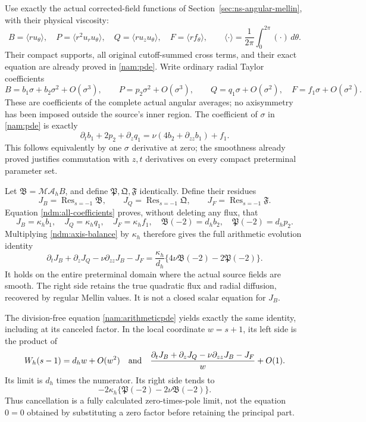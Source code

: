 Use exactly the actual corrected-field functions of
Section~\ref{sec:ns-angular-mellin}, with their physical viscosity:
\[
 B=\langle r u_\theta\rangle,\quad
 P=\langle r^2u_ru_\theta\rangle,\quad
 Q=\langle r u_z u_\theta\rangle,\quad
 F=\langle r f_\theta\rangle,\qquad
 \langle\cdot\rangle=\frac1{2\pi}\int_0^{2\pi}(\cdot)\,d\theta .
\]
Their compact supports, all original cutoff-summed cross terms,
and their exact equation are already proved in \eqref{nam:pde}.
Write ordinary radial Taylor coefficients
\[
 B=b_1\sigma+b_2\sigma^2+O(\sigma^3),\qquad
 P=p_2\sigma^2+O(\sigma^3),\qquad
 Q=q_1\sigma+O(\sigma^2),\quad F=f_1\sigma+O(\sigma^2).
\]
These are coefficients of the complete actual angular averages;
no axisymmetry has been imposed outside the source's inner region.
The coefficient of \(\sigma\) in \eqref{nam:pde} is exactly
\begin{equation}\label{ndm:axis-balance}
 \partial_tb_1+2p_2+\partial_zq_1
       =\nu(4b_2+\partial_{zz}b_1)+f_1 .
\end{equation}
This follows equivalently by one \(\sigma\) derivative at zero;
the smoothness already proved justifies commutation with \(z,t\)
derivatives on every compact preterminal parameter set.

Let \(\mathfrak B=\mathcal M\mathcal A_hB\), and define
\(\mathfrak P,\mathfrak Q,\mathfrak F\) identically.
Define their residues
\[
 J_B=\operatorname{Res}_{s=-1}\mathfrak B,\qquad
 J_Q=\operatorname{Res}_{s=-1}\mathfrak Q,\qquad
 J_F=\operatorname{Res}_{s=-1}\mathfrak F .
\]
Equation \eqref{ndm:all-coefficients} proves, without deleting any
flux, that
\[
 J_B=\kappa_hb_1,\quad J_Q=\kappa_hq_1,\quad
 J_F=\kappa_hf_1,\quad
 \mathfrak B(-2)=d_hb_2,\quad
 \mathfrak P(-2)=d_hp_2.
\]
Multiplying \eqref{ndm:axis-balance} by \(\kappa_h\) therefore gives
the full arithmetic evolution identity
\begin{equation}\label{ndm:arithmetic-balance}
 \boxed{\quad
 \partial_tJ_B+\partial_zJ_Q-\nu\partial_{zz}J_B-J_F
 =\frac{\kappa_h}{d_h}
      \{4\nu\mathfrak B(-2)-2\mathfrak P(-2)\}.\quad}
\end{equation}
It holds on the entire preterminal domain where the actual source
fields are smooth. The right side retains the true quadratic flux
and radial diffusion, recovered by regular Mellin values. It is not
a closed scalar equation for \(J_B\).

The division-free equation \eqref{nam:arithmeticpde} yields exactly
the same identity, including at its canceled factor. In the local
coordinate \(w=s+1\), its left side is the product of
\[
 W_h(s-1)=d_hw+O(w^2)
 \quad\hbox{and}\quad
 \frac{\partial_tJ_B+\partial_zJ_Q-\nu\partial_{zz}J_B-J_F}{w}
            +O(1).
\]
Its limit is \(d_h\) times the numerator. Its right side tends to
\[
 -2\kappa_h\{\mathfrak P(-2)-2\nu\mathfrak B(-2)\}.
\]
Thus cancellation is a fully calculated zero-times-pole limit, not
the equation \(0=0\) obtained by substituting a zero factor before
retaining the principal part.

